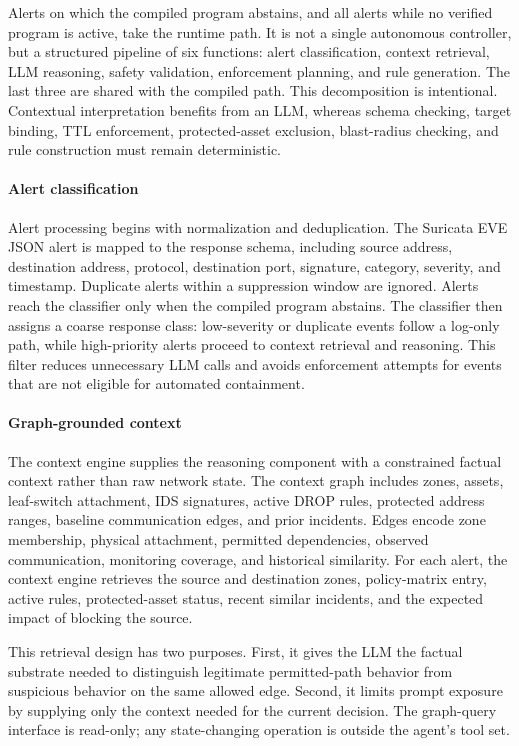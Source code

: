 \documentclass[final,5p]{elsarticle}
\begin{document}
Alerts on which the compiled program abstains, and all alerts while no verified program is active, take the runtime path. It is not a single autonomous controller, but a structured pipeline of six functions: alert classification, context retrieval, LLM reasoning, safety validation, enforcement planning, and rule generation. The last three are shared with the compiled path. This decomposition is intentional. Contextual interpretation benefits from an LLM, whereas schema checking, target binding, TTL enforcement, protected-asset exclusion, blast-radius checking, and rule construction must remain deterministic.

\paragraph{Alert classification}
Alert processing begins with normalization and deduplication. The Suricata EVE JSON alert is mapped to the response schema, including source address, destination address, protocol, destination port, signature, category, severity, and timestamp. Duplicate alerts within a suppression window are ignored. Alerts reach the classifier only when the compiled program abstains. The classifier then assigns a coarse response class: low-severity or duplicate events follow a log-only path, while high-priority alerts proceed to context retrieval and reasoning. This filter reduces unnecessary LLM calls and avoids enforcement attempts for events that are not eligible for automated containment.

\paragraph{Graph-grounded context}
The context engine supplies the reasoning component with a constrained factual context rather than raw network state. The context graph includes zones, assets, leaf-switch attachment, IDS signatures, active DROP rules, protected address ranges, baseline communication edges, and prior incidents. Edges encode zone membership, physical attachment, permitted dependencies, observed communication, monitoring coverage, and historical similarity. For each alert, the context engine retrieves the source and destination zones, policy-matrix entry, active rules, protected-asset status, recent similar incidents, and the expected impact of blocking the source.

This retrieval design has two purposes. First, it gives the LLM the factual substrate needed to distinguish legitimate permitted-path behavior from suspicious behavior on the same allowed edge. Second, it limits prompt exposure by supplying only the context needed for the current decision. The graph-query interface is read-only; any state-changing operation is outside the agent's tool set.
\end{document}
